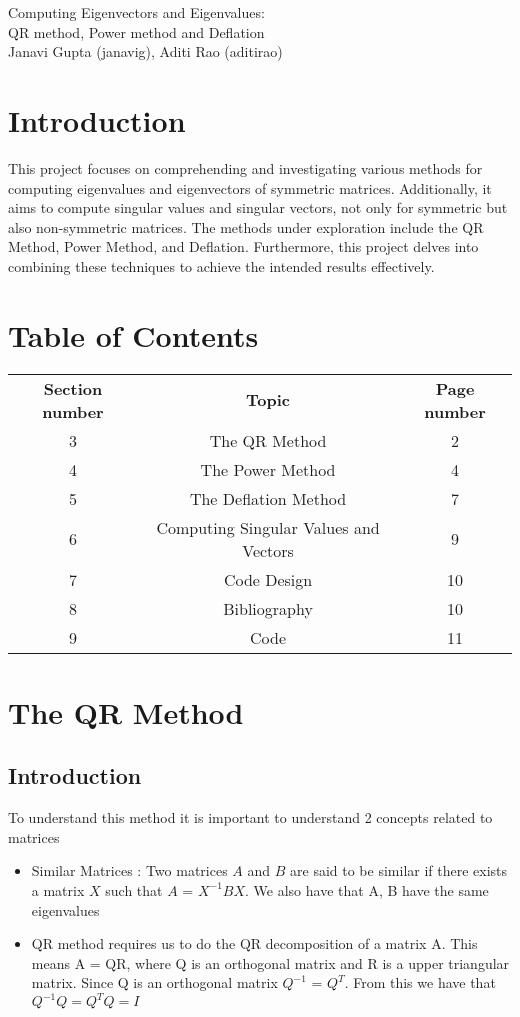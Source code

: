 \documentclass[11pt]{article}
\begin{document}

\begin{center}
{\Huge Computing Eigenvectors and Eigenvalues:\\ QR method, Power method and Deflation}\\
{\Large Janavi Gupta (janavig), Aditi Rao (aditirao)}
\end{center}

\section{Introduction}
This project focuses on comprehending and investigating various methods for computing eigenvalues and eigenvectors of symmetric matrices. Additionally, it aims to compute singular values and singular vectors, not only for symmetric but also non-symmetric matrices. The methods under exploration include the QR Method, Power Method, and Deflation. Furthermore, this project delves into combining these techniques to achieve the intended results effectively.

\section{Table of Contents}
\begin{center}
\begin{tabular}{ c  c  c }
 \textbf{Section number} & \textbf{Topic} & \textbf{Page number} \\ 
 3 & The QR Method & 2 \\  
 4 & The Power Method & 4 \\
 5 & The Deflation Method & 7 \\
 6 & Computing Singular Values and Vectors & 9 \\
 7 & Code Design & 10 \\
 8 & Bibliography & 10 \\
 9 & Code & 11
\end{tabular}
\end{center}

\newpage
\section{The QR Method}
\subsection{Introduction}
To understand this method it is important to understand 2 concepts related to matrices
\begin{itemize}
    \item Similar Matrices : Two matrices $A$ and $B$ are said to be similar if there exists a matrix $X$ such that $A$ = $X^{-1}BX$. We also have that A, B have the same eigenvalues\\
    \item QR method requires us to do the QR decomposition of a matrix A. This means A = QR, where Q is an orthogonal matrix and R is a upper triangular matrix. Since Q is an orthogonal matrix $Q^{-1}$ = $Q^{T}$. From this we have that  $Q^{-1}Q = Q^{T}Q = I$
\end{itemize}
\end{document}
